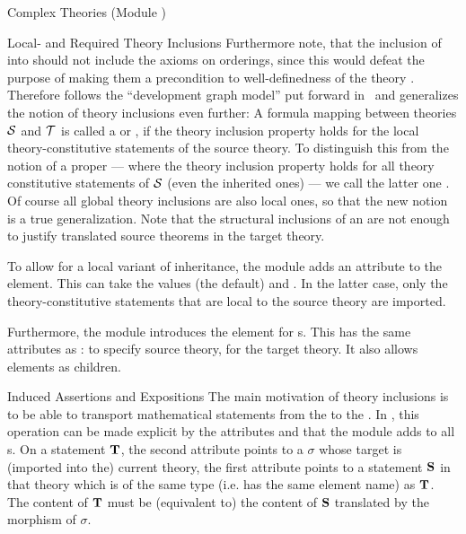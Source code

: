 \begin{tchapter}[id=complex-theories,short=Complex Theories]{Complex Theories (Module
    )}
\begin{tsection}[id=restricting-inference,short=Local/Required Theory Inclusions]{Local- and Required Theory Inclusions}
Furthermore note, that the inclusion of  into 
should not include the  axioms on orderings, since this would defeat the
purpose of making them a precondition to well-definedness of the theory
. Therefore \omdoc follows the ``development graph model'' put
forward in~\cite{Hutter:mocsv00} and generalizes the notion of theory inclusions even
further: A formula mapping between theories ${\cal S}$ and ${\cal T}$ is called a
 or , if the theory
inclusion property holds for the local theory-constitutive statements of the source
theory.  To distinguish this from the notion of a proper  ---
where the theory inclusion property holds for all theory constitutive statements of ${\cal S}$
(even the inherited ones) --- we call the latter one . Of course all
global theory inclusions are also local ones, so that the new notion is a true
generalization. Note that the structural inclusions of an  are
not enough to justify translated source theorems in the target theory.

To allow for a local variant of inheritance, the  module adds an
attribute  to the  element. This can take
the values  (the default) and
. In the latter case, only the theory-constitutive
statements that are local to the source theory are imported.
  
Furthermore, the  module introduces the 
element for s. This has the same attributes as
:  to specify source
theory,  for the target theory. It also allows
 elements as children.
\end{tsection}

\begin{tsection}[id=induced-assertions,short=Induced Assertions]{Induced Assertions and Expositions}
  The main motivation of theory inclusions is to be able to transport mathematical
  statements from the  to the . In
  \omdoc, this operation can be made explicit by the attributes
   and  that the module
   adds to all s.  On a statement
  ${\bf T}$, the second attribute points to a  $\sigma$ whose
  target is (imported into the) current theory, the first attribute points to a statement
  ${\bf S}$ in that theory which is of the same type (i.e. has the same \omdoc element name)
  as ${\bf T}$.  The content of ${\bf T}$ must be (equivalent to) the content of ${\bf S}$ translated
  by the morphism of $\sigma$.
  

\end{tsection}
\end{tchapter}
